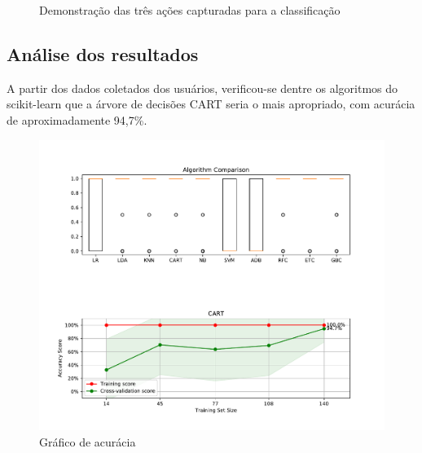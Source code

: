 \begin{figure}[ht]
	\caption{\label{fig:result_estados}Demonstração das três ações capturadas para a classificação}
	\begin{center}
	   \missingfigure[figwidth=\textwidth]{}
	\end{center}
\end{figure}

\subsection{Análise dos resultados}\label{sec:result_analise}

A partir dos dados coletados dos usuários, verificou-se dentre os algoritmos do scikit-learn que a árvore de decisões CART seria o mais apropriado, com acurácia de aproximadamente 94,7\%.

\begin{figure}[ht]
	\caption{\label{fig:result_accuracy_plot}Gráfico de acurácia}
	\begin{center}
	    \includegraphics[width=\textwidth]{resources/result_accuracy_plot}
	\end{center}
\end{figure}

